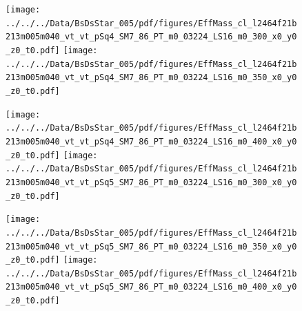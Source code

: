 \documentclass[a4paper,10pt]{article}
\begin{document}
\clearpage
\begin{figure}[p]
 \texttt{[image: ../../../Data/BsDsStar\_005/pdf/figures/EffMass\_cl\_l2464f21b213m005m040\_vt\_vt\_pSq4\_SM7\_86\_PT\_m0\_03224\_LS16\_m0\_300\_x0\_y0\_z0\_t0.pdf]} 
 \texttt{[image: ../../../Data/BsDsStar\_005/pdf/figures/EffMass\_cl\_l2464f21b213m005m040\_vt\_vt\_pSq4\_SM7\_86\_PT\_m0\_03224\_LS16\_m0\_350\_x0\_y0\_z0\_t0.pdf]} 
 \end{figure}
\begin{figure}[p]
 \texttt{[image: ../../../Data/BsDsStar\_005/pdf/figures/EffMass\_cl\_l2464f21b213m005m040\_vt\_vt\_pSq4\_SM7\_86\_PT\_m0\_03224\_LS16\_m0\_400\_x0\_y0\_z0\_t0.pdf]} 
 \texttt{[image: ../../../Data/BsDsStar\_005/pdf/figures/EffMass\_cl\_l2464f21b213m005m040\_vt\_vt\_pSq5\_SM7\_86\_PT\_m0\_03224\_LS16\_m0\_300\_x0\_y0\_z0\_t0.pdf]} 
 \end{figure}
\begin{figure}[p]
 \texttt{[image: ../../../Data/BsDsStar\_005/pdf/figures/EffMass\_cl\_l2464f21b213m005m040\_vt\_vt\_pSq5\_SM7\_86\_PT\_m0\_03224\_LS16\_m0\_350\_x0\_y0\_z0\_t0.pdf]} 
 \texttt{[image: ../../../Data/BsDsStar\_005/pdf/figures/EffMass\_cl\_l2464f21b213m005m040\_vt\_vt\_pSq5\_SM7\_86\_PT\_m0\_03224\_LS16\_m0\_400\_x0\_y0\_z0\_t0.pdf]} 
 \end{figure}
\clearpage
\clearpage
\end{document}
